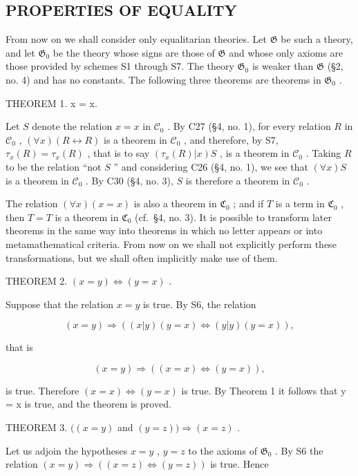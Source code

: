 \subsection{PROPERTIES OF EQUALITY}

From now on we shall consider only equalitarian theories. Let \(\mathfrak{G}\) be such a theory, and let \(\mathfrak{G}_0\) be the theory whose signs are those of \(\mathfrak{G}\) and whose only axioms are those provided by schemes S1 through S7. The theory \(\mathfrak{G}_0\) is weaker than \(\mathfrak{G}\) (§2, no. 4) and has no constants. The following three theorems are theorems in \(\mathfrak{G}_0\) .

THEOREM 1. x = x.

Let \(S\) denote the relation \(x = x\) in \(\mathcal{C}_0\) . By C27 (§4, no. 1), for every relation \(R\) in \(\mathcal{C}_0\) , \((\forall x)(R \leftrightarrow R)\) is a theorem in \(\mathcal{C}_0\) , and therefore, by S7, \(\tau_x(R) = \tau_x(R)\) , that is to say \((\tau_x(R)|x)S\) , is a theorem in \(\mathcal{C}_0\) . Taking \(R\) to be the relation ``not \(S\) '' and considering C26 (§4, no. 1), we see that \((\forall x)S\) is a theorem in \(\mathcal{C}_0\) . By C30 (§4, no. 3), \(S\) is therefore a theorem in \(\mathcal{C}_0\) .

The relation \((\forall x)(x = x)\) is also a theorem in \(\mathfrak{C}_0\) ; and if \(T\) is a term in \(\mathfrak{C}_0\) , then \(T = T\) is a theorem in \(\mathfrak{C}_0\) (cf.~§4, no. 3). It is possible to transform later theorems in the same way into theorems in which no letter appears or into metamathematical criteria. From now on we shall not explicitly perform these transformations, but we shall often implicitly make use of them.

THEOREM 2. \((x = y) \Longleftrightarrow (y = x)\) .

Suppose that the relation \(x = y\) is true. By S6, the relation

\[
(x = y) \Longrightarrow ((x | y) (y = x) \Longleftrightarrow (y | y) (y = x)),
\]

that is

\[
(x = y) \Longrightarrow ((x = x) \Longleftrightarrow (y = x)),
\]

is true. Therefore \((x = x) \Longleftrightarrow (y = x)\) is true. By Theorem 1 it follows that y = x is true, and the theorem is proved.

THEOREM 3. \(((x = y)\) and \((y = z))\Longrightarrow (x = z)\) .

Let us adjoin the hypotheses \(x = y\) , \(y = z\) to the axioms of \(\mathfrak{G}_0\) . By S6 the relation \((x = y) \Longrightarrow ((x = z) \Longleftrightarrow (y = z))\) is true. Hence

